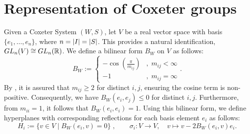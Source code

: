 \section{Representation of Coxeter groups}

Given a Coxeter System \((W,S)\), let \(V\) be a real vector space with basis \(\{e_1,\ldots,e_n\}\), where \(n=\left\vert I\right\vert=\left\vert S\right\vert\).
This provides a natural identification, \(GL_n(V)\cong GL_n(\mathbb{R})\).
We define a bilinear form \(B_W\) on \(V\) as follows:
\begin{equation*}
    B_W := \begin{cases}
        -\cos \left(\frac{\pi}{m_{ij}}\right) & ,\; m_{ij}<\infty \\
        -1                                    & ,\; m_{ij}=\infty
    \end{cases}.
\end{equation*}
By , it is assured that \(m_{ij}\geq 2\) for distinct \(i,j\), ensuring the cosine term is non-positive.
Consequently, we have \(B_W(e_i,e_j)\leq 0\) for distinct \(i,j\).
Furthermore, from \(m_{ii}=1\), it follows that \(B_W(e_i,e_i)=1\).
Using this bilinear form, we define hyperplanes with corresponding reflections for each basis element \(e_i\) as follows:
\[H_i := \{v\in V\;\vert\; B_W(e_i,v) = 0\}\;, \qquad \sigma_i : V\to V,\quad v\mapsto v - 2B_W(e_i,v)e_i.\]


